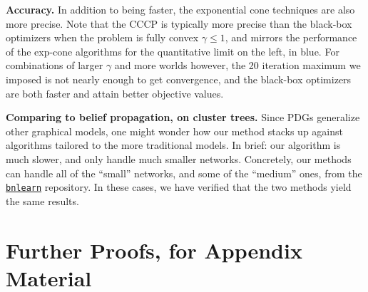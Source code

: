 \textbf{Accuracy.}
In addition to being faster, the exponential cone techniques are also more precise.
Note that the CCCP is typically more precise than the black-box optimizers when the problem is fully convex $\gamma \le 1$, and mirrors the performance of the exp-cone algorithms for the quantitative limit on the left, in blue.  For combinations of larger $\gamma$ and more worlds however, the 20 iteration maximum we imposed is not nearly enough to get convergence, and the black-box optimizers are both faster and attain better objective values.






\textbf{Comparing to belief propagation, on cluster trees.}
Since PDGs generalize other graphical models, one might wonder how our method stacks up against algorithms tailored to the more traditional models. In brief: our algorithm is much slower, and only handle much smaller networks. 
Concretely, our methods can handle all of the ``small'' networks, and some of the ``medium'' ones, from the \href{https://www.bnlearn.com/bnrepository/}{\texttt{bnlearn}} repository. 
 In these cases, we have verified that the two methods yield the same results. 




\section{Further Proofs, for Appendix Material}

